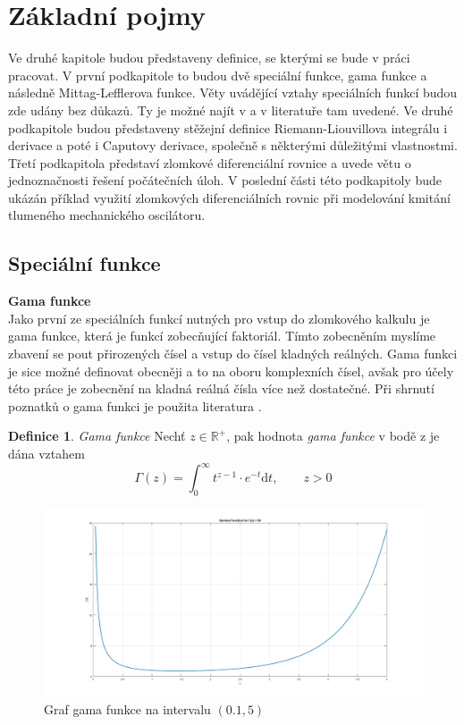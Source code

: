 \documentclass[a4paper,12pt,twoside]{article}
\theoremstyle{definition}
\newtheorem{defin}[veta]{Definice}
\theoremstyle{remark}
\numberwithin{equation}{section}
\numberwithin{table}{section}
\numberwithin{figure}{section}
\newcommand{\dx}[1]{\mathrm{d} #1}
\newcommand{\R}{\mathbb{R}}
\begin{document}
\section{Základní pojmy}
Ve druhé kapitole budou představeny definice, se kterými se bude v práci pracovat. V první podkapitole to budou dvě speciální funkce, gama funkce a následně Mittag-Lefflerova funkce. Věty uvádějící vztahy speciálních funkcí budou zde udány bez důkazů. Ty je možné najít v \cite{Podlubny} a v literatuře tam uvedené.
Ve druhé podkapitole budou představeny stěžejní definice Riemann-Liouvillova integrálu i derivace a poté i Caputovy derivace, společně s některými důležitými vlastnostmi.
Třetí podkapitola představí zlomkové diferenciální rovnice a uvede větu o jednoznačnosti řešení počátečních úloh. V poslední části této podkapitoly bude ukázán příklad využití zlomkových diferenciálních rovnic při modelování kmitání tlumeného mechanického oscilátoru.
\subsection{Speciální funkce}
\textbf{Gama funkce} \\
Jako první ze speciálních funkcí nutných pro vstup do zlomkového kalkulu je gama funkce, která je funkcí zobecňující faktoriál. Tímto zobecněním myslíme zbavení se pout přirozených čísel a vstup do čísel kladných reálných. Gama funkci je sice možné definovat obecněji a to na oboru komplexních čísel, avšak pro účely této práce je zobecnění na kladná reálná čísla více než dostatečné.
Při shrnutí poznatků o gama funkci je použita literatura \cite{Bashour}.
 
\begin{defin}{\emph{Gama funkce}} \label{GammaFunkce}
	Nechť $z \in \R ^{+}$, pak hodnota \emph{gama funkce} v bodě z je dána vztahem
	$$
	\Gamma \left( z\right)  = \int_{0}^{ \infty } t^{z-1} \cdot e^{-t} \dx{t}, \qquad   z > 0
	$$
\end{defin}


\begin{figure} [h!] 
	\caption{Graf gama funkce na  intervalu $\left(0.1, 5\right)$}
	\label{GrafGamma}
	\includegraphics[width=1\textwidth]{Gamma+.jpg}
\end{figure}
\end{document}
